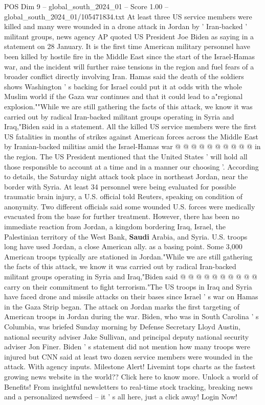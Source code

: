 \begin{textsample}{POS Dim 9 – global\_south\_2024\_01 – Score 1.00 – global\_south\_2024\_01/105471834.txt}  \label{ex:f9_pos_024}
At least three US service members were killed and many were wounded in a drone attack in Jordan by ' Iran-backed ' militant groups, news agency AP quoted US President Joe Biden as saying in a statement on 28 January.
It is the first time American military personnel have been killed by hostile fire in the Middle East since the start of the Israel-Hamas war, and the incident will further raise tensions in the region and fuel fears of a broader conflict directly involving Iran.
Hamas said the death of the soldiers shows Washington ' s backing for Israel could put it at odds with the whole Muslim world if the Gaza war continues and that it could lead to a"regional explosion.""While we are still gathering the facts of this attack, we know it was carried out by radical Iran-backed militant groups operating in Syria and Iraq,"Biden said in a statement.
All the killed US service members were the first US fatalities in months of strikes against American forces across the Middle East by Iranian-backed militias amid the Israel-Hamas war @ @ @ @ @ @ @ @ @ @ in the region.
The US President mentioned that the United States ' will hold all those responsible to account at a time and in a manner our choosing '.
According to details, the Saturday night attack took place in northeast Jordan, near the border with Syria.
At least 34 personnel were being evaluated for possible traumatic brain injury, a U.S. official told Reuters, speaking on condition of anonymity.
Two different officials said some wounded U.S. forces were medically evacuated from the base for further treatment.
However, there has been no immediate reaction from Jordan, a kingdom bordering Iraq, Israel, the Palestinian territory of the West Bank, \textbf{Saudi} Arabia, and Syria.
U.S. troops long have used Jordan, a close American ally. as a basing point.
Some 3,000 American troops typically are stationed in Jordan."While we are still gathering the facts of this attack, we know it was carried out by radical Iran-backed militant groups operating in Syria and Iraq,"Biden said @ @ @ @ @ @ @ @ @ @ carry on their commitment to fight terrorism."The US troops in Iraq and Syria have faced drone and missile attacks on their bases since Israel ' s war on Hamas in the Gaza Strip began.
The attack on Jordan marks the first targeting of American troops in Jordan during the war.
Biden, who was in South Carolina ' s Columbia, was briefed Sunday morning by Defense Secretary Lloyd Austin, national security adviser Jake Sullivan, and principal deputy national security adviser Jon Finer.
Biden ' s statement did not mention how many troops were injured but CNN said at least two dozen service members were wounded in the attack.
With agency inputs.
Milestone Alert!
Livemint tops charts as the fastest growing news website in the world??
Click here to know more.
Unlock a world of Benefits!
From insightful newsletters to real-time stock tracking, breaking news and a personalized newsfeed -- it ' s all here, just a click away!
Login Now!

\end{textsample}

